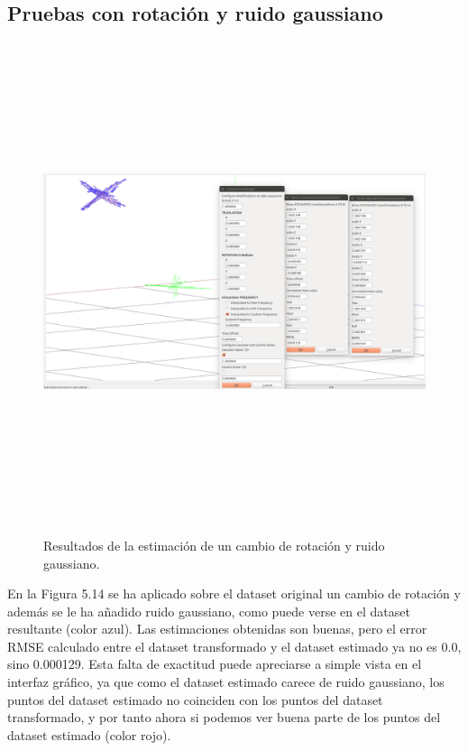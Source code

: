 \subsection{Pruebas con rotación y ruido gaussiano}
\begin{figure}[H]
\begin{center}
\label{fig:opciones de View}\includegraphics[height=14.0cm,width=18.0cm]{img/cap6/Rota_GaussNoise_abba.png}
\hspace{0.5cm}

\end{center}

\caption{Resultados de la estimación de un cambio de rotación y ruido gaussiano.}
\end{figure}
En la Figura 5.14 se ha aplicado sobre el dataset original un cambio de rotación y además se le ha añadido ruido gaussiano, como puede verse en el dataset resultante (color azul). Las estimaciones obtenidas son buenas, pero el error RMSE calculado entre el dataset transformado y el dataset estimado ya no es 0.0, sino 0.000129. Esta falta de exactitud puede apreciarse a simple vista en el interfaz gráfico, ya que como el dataset estimado carece de ruido gaussiano, los puntos del dataset estimado no coinciden con los puntos del dataset transformado, y por tanto ahora si podemos ver buena parte de los puntos del dataset estimado (color rojo).


